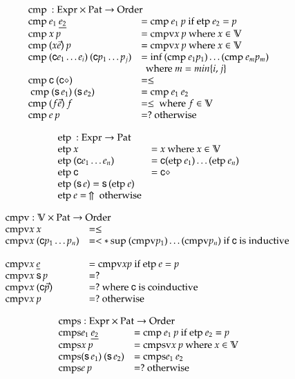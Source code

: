 \[
\begin{array}[t]{ll}
\multicolumn{2}{l}{\cmp : \Expr \times \Pat \ra \order}\\ 
\cmp e_1 \: \inacc{e_2} & = \cmp e_1 \: p \mbox{ if } \etp e_2 = p \\
\cmp x \: p & = \cmpv x \:p  \mbox{ where } x \in \cV \\
\cmp (x \vec{e}) \: p & = \cmpv x \:p  \mbox{ where } x \in \cV \\
\cmp (\cc e_1 \ldots e_i) \: (\cc p_1 \ldots p_j ) & = \info (\cmp e_1 p_1) \ldots (\cmp e_m p_m)\\
& \: \mbox { where } m = min\{i,j\}\\ 
\cmp \cc \: (\cc \diamond) & = \leq \\\
\cmp (\s e_1) \: (\s e_2) & = \cmp e_1 \: e_2 \\
\cmp (f \vec{e}) \: f & = \leq \mbox{ where } f \in \cV \\
\cmp e \: p & = ? \mbox{ otherwise}
\end{array}
\]

\[
\begin{array}[t]{ll}
\multicolumn{2}{l}{\etp : \Expr \ra \Pat}\\ 
\etp x & = x \mbox{ where } x \in \cV \\
\etp (\cc e_1 \ldots e_n ) & = \cc (\etp e_1) \ldots (\etp e_n) \\
\etp \cc  & = \cc \diamond \\
\etp (\s e) = \s (\etp e) \\
\etp e = \stuck \mbox{ otherwise}
\end{array}
\]

\[
\begin{array}[t]{ll}
\multicolumn{2}{l}{\cmpv : \cV \times \Pat \ra \order}\\ 
\cmpv x \: x & = \leq \\
\cmpv x \: (\cc p_1 \ldots p_n ) & = < * \: \supo (\cmpv p_1) \ldots (\cmpv p_n) \mbox{ if } \cc \mbox{ is inductive }\\   \\
\cmpv x \: \inacc{e} & = \cmpv x p \mbox{ if } \etp e = p \\
\cmpv x \: \s p & = ? \\
\cmpv x \: (\cc \vec{p}) & = ? \mbox{ where } \cc \mbox{ is coinductive}\\
\cmpv x \: p & = ? \mbox{ otherwise}
\end{array}
\]

\[
\begin{array}[t]{ll}
\multicolumn{2}{l}{\cmps : \Expr \times \Pat \ra \order}\\ 
\cmps e_1 \: \inacc{e_2} & = \cmp e_1 \: p \mbox{ if } \etp e_2 = p \\
\cmps x \: p & = \cmpsv x \:p  \mbox{ where } x \in \cV \\
\cmps (\s e_1) \: (\s e_2) & = \cmps e_1 \: e_2 \\
\cmps e \: p & = ? \mbox{ otherwise}
\end{array}
\]


